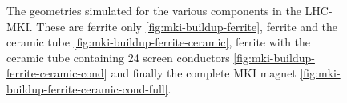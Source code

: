 \begin{figure}
\caption{The geometries simulated for the various components in the LHC-MKI. These are ferrite only \ref{fig:mki-buildup-ferrite}, ferrite and the ceramic tube \ref{fig:mki-buildup-ferrite-ceramic}, ferrite with the ceramic tube containing 24 screen conductors \ref{fig:mki-buildup-ferrite-ceramic-cond} and finally the complete MKI magnet \ref{fig:mki-buildup-ferrite-ceramic-cond-full}.}
\label{fig:mki-layout-buildup}
\end{figure}

